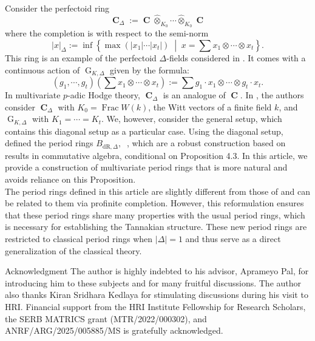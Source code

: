 \documentclass{amsart}
\DeclareMathOperator{\Frac}{Frac}
\DeclareMathOperator{\C}{\textbf{C}}
\newcommand{\mBdr}{B_{\mathrm{dR},\Delta}}
\DeclareMathOperator{\BHT}{B_{HT}}
\DeclareMathOperator{\G}{G}
\begin{document}
Consider the perfectoid ring
\begin{equation*}
    \C_\Delta:=\C\hat{\otimes}_{K_0}\cdots\hat{\otimes}_{K_0}\C
\end{equation*}
where the completion is with respect to the semi-norm
\begin{equation*}
    |x|_\Delta:=\inf\left\{\max(|x_1|\cdots|x_t|)\;\middle|\; x=\sum x_1\otimes\cdots\otimes x_t\right\}.
\end{equation*}
This ring is an example of the perfectoid $\Delta$-fields considered in \cite{Pok-Pal}. It comes with a continuous action of $\G_{K,\Delta}$ given by the formula:
\begin{equation*}
  (g_1,\cdots,g_t)\left(\sum x_1\otimes\cdots\otimes x_t\right):=\sum g_1\cdot x_1\otimes\cdots\otimes g_t\cdot x_t.
\end{equation*}
In multivariate $p$-adic Hodge theory, $\C_\Delta$ is an analogue of $\C$. In \cite{BCM}, the authors consider $\C_\Delta$ with $K_0=\Frac W(k)$, the Witt vectors of a finite field $k$, and $\G_{K,\Delta}$ with $K_1=\cdots=K_t$. We, however, consider the general setup, which contains this diagonal setup as a particular case. Using the diagonal setup, \cite{BCM} defined the period rings $\mBdr, \BHT$, which are a robust construction based on results in commutative algebra, conditional on Proposition 4.3. In this article, we provide a construction of multivariate period rings that is more natural and avoids reliance on this Proposition.\\

The period rings defined in this article are slightly different from those of \cite{BCM} and can be related to them via profinite completion. However, this reformulation ensures that these period rings share many properties with the usual period rings, which is necessary for establishing the Tannakian structure. These new period rings are restricted to classical period rings when $|\Delta|=1$ and thus serve as a direct generalization of the classical theory.


\begin{subsection}{Acknowledgment}
The author is highly indebted to his advisor, Aprameyo Pal, for introducing him to these subjects and for many fruitful discussions. The author also thanks Kiran Sridhara Kedlaya for stimulating discussions during his visit to HRI. Financial support from the HRI Institute Fellowship for Research Scholars, the SERB MATRICS grant (MTR/2022/000302), and ANRF/ARG/2025/005885/MS is gratefully acknowledged.
\end{subsection}
\end{document}
